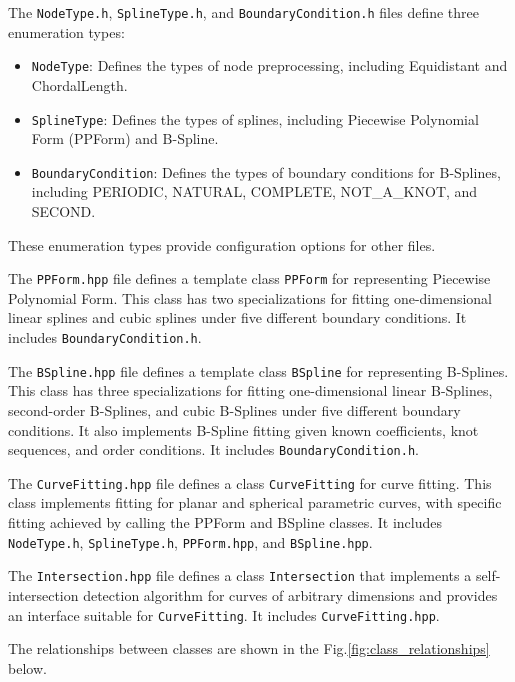 \documentclass[a4paper]{article}
\begin{document}
\begin{sloppypar}
The \verb|NodeType.h|, \verb|SplineType.h|, and \verb|BoundaryCondition.h|
files define three enumeration types:
\begin{itemize}
  \item \verb|NodeType|: Defines the types of node preprocessing, including Equidistant and ChordalLength.
  \item \verb|SplineType|: Defines the types of splines, including Piecewise Polynomial Form (PPForm) and B-Spline.
  \item \verb|BoundaryCondition|: Defines the types of boundary conditions for B-Splines, including PERIODIC, NATURAL, COMPLETE, NOT\_A\_KNOT, and SECOND.
\end{itemize}
These enumeration types provide configuration options for other files.

The \verb|PPForm.hpp| file defines a template class \verb|PPForm| for
representing Piecewise Polynomial Form. This class has two specializations for
fitting one-dimensional linear splines and cubic splines under five different
boundary conditions. It includes \verb|BoundaryCondition.h|.

The \verb|BSpline.hpp| file defines a template class \verb|BSpline| for
representing B-Splines. This class has three specializations for fitting
one-dimensional linear B-Splines, second-order B-Splines, and cubic B-Splines
under five different boundary conditions. It also implements B-Spline fitting
given known coefficients, knot sequences, and order conditions. It includes
\verb|BoundaryCondition.h|.

The \verb|CurveFitting.hpp| file defines a class \verb|CurveFitting| for curve
fitting. This class implements fitting for planar and spherical parametric
curves, with specific fitting achieved by calling the PPForm and BSpline
classes. It includes \verb|NodeType.h|, \verb|SplineType.h|, \verb|PPForm.hpp|,
and \verb|BSpline.hpp|.

The \verb|Intersection.hpp| file defines a class \verb|Intersection| that
implements a self-intersection detection algorithm for curves of arbitrary
dimensions and provides an interface suitable for \verb|CurveFitting|. It
includes \verb|CurveFitting.hpp|.

The relationships between classes are shown in the
Fig.\ref{fig:class_relationships} below.

\begin{figure}[H]
  \centering
  \begin{tikzpicture}[
      class/.style={rectangle, draw=black, fill=blue!20, text centered, rounded corners, minimum height=2em},
      file/.style={rectangle, draw=black, fill=green!20, text centered, rounded corners, minimum height=2em},
      enum/.style={rectangle, draw=black, fill=yellow!20, text centered, rounded corners, minimum height=2em},
      arrow/.style={->, thick}
    ]


\end{tikzpicture}
\end{figure}
\end{sloppypar}
\end{document}
